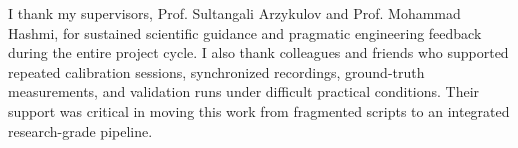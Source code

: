 I thank my supervisors, Prof. Sultangali Arzykulov and Prof. Mohammad Hashmi, for sustained scientific guidance and pragmatic engineering feedback during the entire project cycle. I also thank colleagues and friends who supported repeated calibration sessions, synchronized recordings, ground-truth measurements, and validation runs under difficult practical conditions. Their support was critical in moving this work from fragmented scripts to an integrated research-grade pipeline.
